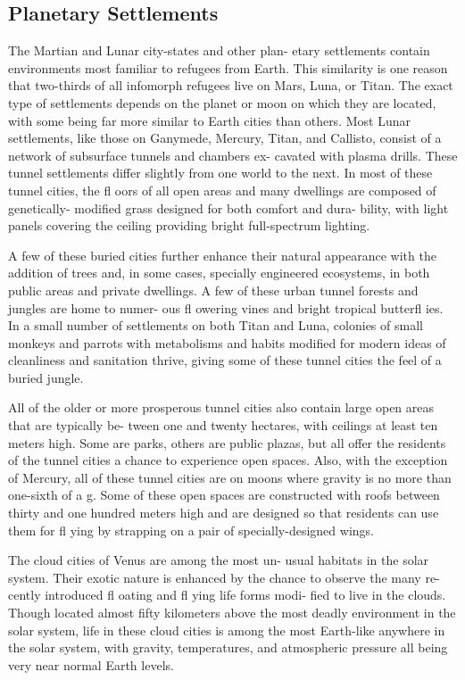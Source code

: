 \subsection{Planetary Settlements}

The Martian and Lunar city-states and other plan-
etary settlements contain environments most familiar 
to refugees from Earth. This similarity is one reason 
that two-thirds of all infomorph refugees live on 
Mars, Luna, or Titan. The exact type of settlements 
depends on the planet or moon on which they are 
located, with some being far more similar to Earth 
cities than others. Most Lunar settlements, like those 
on Ganymede, Mercury, Titan, and Callisto, consist 
of a network of subsurface tunnels and chambers ex-
cavated with plasma drills. These tunnel settlements 
differ slightly from one world to the next. In most 
of these tunnel cities, the fl oors of all open areas 
and many dwellings are composed of genetically-
modified grass designed for both comfort and dura-
bility, with light panels covering the ceiling providing 
bright full-spectrum lighting.

A few of these buried cities further enhance their 
natural appearance with the addition of trees and, in 
some cases, specially engineered ecosystems, in both 
public areas and private dwellings. A few of these 
urban tunnel forests and jungles are home to numer-
ous fl owering vines and bright tropical butterfl ies. 
In a small number of settlements on both Titan and 
Luna, colonies of small monkeys and parrots with 
metabolisms and habits modified for modern ideas 
of cleanliness and sanitation thrive, giving some of 
these tunnel cities the feel of a buried jungle.

All of the older or more prosperous tunnel cities 
also contain large open areas that are typically be-
tween one and twenty hectares, with ceilings at least 
ten meters high. Some are parks, others are public 
plazas, but all offer the residents of the tunnel cities 
a chance to experience open spaces. Also, with the 
exception of Mercury, all of these tunnel cities are on 
moons where gravity is no more than one-sixth of a g. 
Some of these open spaces are constructed with roofs 
between thirty and one hundred meters high and are 
designed so that residents can use them for fl ying by 
strapping on a pair of specially-designed wings.

The cloud cities of Venus are among the most un-
usual habitats in the solar system. Their exotic nature 
is enhanced by the chance to observe the many re-
cently introduced fl oating and fl ying life forms modi-
fied to live in the clouds. Though located almost fifty 
kilometers above the most deadly environment in the 
solar system, life in these cloud cities is among the 
most Earth-like anywhere in the solar system, with 
gravity, temperatures, and atmospheric pressure all 
being very near normal Earth levels.

